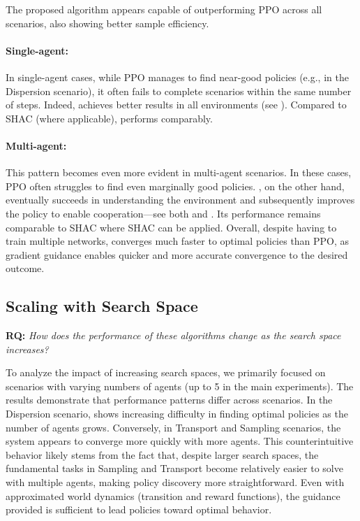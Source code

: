 The proposed algorithm appears capable of outperforming PPO across all scenarios, also showing better sample efficiency.

\noindent\paragraph{Single-agent:} In single-agent cases, while PPO manages to find near-good policies (e.g., in the Dispersion scenario), it often fails to complete scenarios within the same number of steps. Indeed, \fname{} achieves better results in all environments (see ). Compared to SHAC (where applicable), \fname{} performs comparably.

\noindent\paragraph{Multi-agent:} This pattern becomes even more evident in multi-agent scenarios. In these cases, PPO often struggles to find even marginally good policies. \fname{}, on the other hand, eventually succeeds in understanding the environment and subsequently improves the policy to enable cooperation---see both  and . Its performance remains comparable to SHAC where SHAC can be applied.
Overall, despite having to train multiple networks, \fname{} converges much faster to optimal policies than PPO, as gradient guidance enables quicker and more accurate convergence to the desired outcome.


\subsection{Scaling with Search Space}
\textbf{RQ:} \emph{How does the performance of these algorithms change as the search space increases?}

To analyze the impact of increasing search spaces, we primarily focused on scenarios with varying numbers of agents (up to 5 in the main experiments). The results demonstrate that performance patterns differ across scenarios. In the Dispersion scenario, \fname{} shows increasing difficulty in finding optimal policies as the number of agents grows. Conversely, in Transport and Sampling scenarios, the system appears to converge more quickly with more agents. This counterintuitive behavior likely stems from the fact that, despite larger search spaces, the fundamental tasks in Sampling and Transport become relatively easier to solve with multiple agents, making policy discovery more straightforward. Even with approximated world dynamics (transition and reward functions), the guidance provided is sufficient to lead policies toward optimal behavior.

